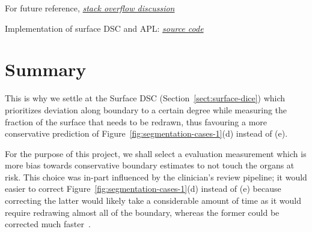 \documentclass[11pt,twoside]{report}
\begin{document}
\begin{warning}
  For future reference, \textit{\href{https://stackoverflow.com/questions/73286639/how-to-calculate-added-path-length-apl-image-segmentation-metric}{stack overflow discussion}}

  Implementation of surface DSC and APL: \textit{\href{https://github.com/pyplati/platipy/blob/master/platipy/imaging/label/comparison.py}{source code}}
\end{warning}

\section{Summary}

This is why we settle at the Surface DSC (Section~\ref{sect:surface-dice}) which prioritizes deviation along boundary to a certain degree while measuring the fraction of the surface that needs to be redrawn, thus favouring a more conservative prediction of Figure~\ref{fig:segmentation-cases-1}(d) instead of (e).

For the purpose of this project, we shall select a evaluation measurement which is more bias towards conservative boundary estimates to not touch the organs at risk. This choice was in-part influenced by the clinician's review pipeline; it would easier to correct Figure~\ref{fig:segmentation-cases-1}(d) instead of (e) because correcting the latter would likely take a considerable amount of time as it would require redrawing almost all of the boundary, whereas the former could be corrected much faster~\cite{Nikolov2021-xe}.



\end{document}
